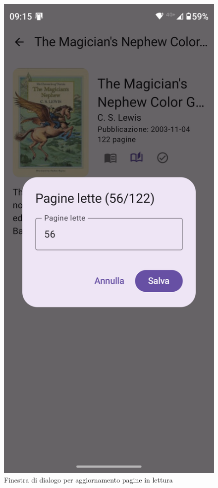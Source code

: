 \documentclass{article}
\begin{document}
\begin{figure}[H]
  \centering
  \includegraphics[width=0.6\linewidth]{pages-read.png}
  \caption{Finestra di dialogo per aggiornamento pagine in lettura}
  \label{fig:sitemap}
\end{figure}
\end{document}
